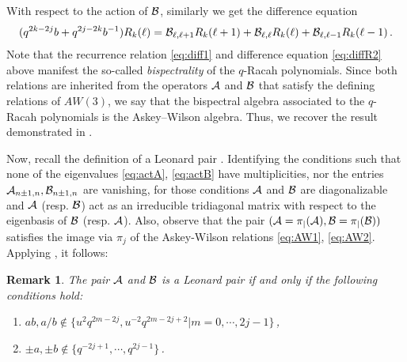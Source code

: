 \documentclass[11pt]{amsart}
\numberwithin{equation}{section}
\newtheorem{rem}[thm]{Remark}
\numberwithin{equation}{section}
\begin{document}
With respect to the action of $\cal B$, similarly we get the difference equation
\begin{align}
    (q^{2k-2j}b+q^{2j-2k}b^{-1})R_k(\ell)={\cal B}_{\ell,\ell+1} R_k(\ell+1)+{\cal B}_{\ell,\ell} R_k(\ell)+{\cal B}_{\ell,\ell-1} R_k(\ell-1)\,.\label{eq:diffR2}
\end{align}
 Note that the recurrence relation \eqref{eq:diff1} and difference equation \eqref{eq:diffR2} above manifest the so-called 
{\it bispectrality} of the $q$-Racah polynomials.
Since both relations are inherited from  the operators $\cal A$ and ${\cal B}$ that satisfy the defining relations of $AW(3)$, we say that the bispectral algebra associated to the $q$-Racah polynomials is the Askey--Wilson algebra. Thus, we recover the result demonstrated in \cite{Z91}.


Now, recall the definition of a Leonard pair \cite[Def.\,1.1]{T01}. Identifying the conditions such that none of the eigenvalues \eqref{eq:actA}, \eqref{eq:actB} have multiplicities, nor the entries ${\cal A}_{n\pm 1,n},{\cal B}_{n\pm 1,n}$ are vanishing, for those conditions  $\cal A$ and $\cal B$ are diagonalizable and $\cal A$ (resp. $\cal B$) act as an irreducible tridiagonal matrix with respect to the eigenbasis of $\cal B$ (resp. $\cal A$). Also, observe that the pair $(\cal A =\pi_j(A), \cal B=\pi_j(B))$ satisfies the image via $\pi_j$ of the Askey-Wilson relations \eqref{eq:AW1}, \eqref{eq:AW2}. Applying  \cite[Thm.\,6.2]{T04}, it follows:

\begin{rem}\label{rem:LPcond} The pair $\cal A$ and $\cal B$ is a Leonard pair if and only if the following conditions hold:
\begin{enumerate}[label=(\roman*)]
\item $ab,a/b \notin \{u^2q^{2m-2j},u^{-2}q^{2m-2j+2}|m=0,\cdots,2j-1\}$\,,
\item $\pm a, \pm b \notin \{q^{-2j+1},\cdots,q^{2j-1}\}$\,. 
\end{enumerate}
\end{rem}
\end{document}
